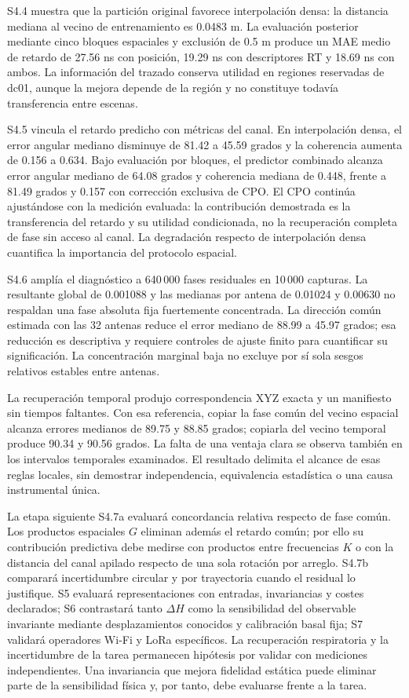 S4.4 muestra que la partición original favorece interpolación densa: la distancia mediana
al vecino de entrenamiento es 0.0483 m. La evaluación posterior mediante cinco bloques
espaciales y exclusión de 0.5 m produce un MAE medio de retardo de 27.56 ns con posición,
19.29 ns con descriptores RT y 18.69 ns con ambos. La información del trazado conserva
utilidad en regiones reservadas de dc01, aunque la mejora depende de la región y no
constituye todavía transferencia entre escenas.

S4.5 vincula el retardo predicho con métricas del canal. En interpolación densa,
el error angular mediano disminuye de 81.42 a 45.59 grados y la coherencia
aumenta de 0.156 a 0.634. Bajo evaluación por bloques,
el predictor combinado alcanza error angular mediano de 64.08 grados y coherencia
mediana de 0.448, frente a 81.49 grados y 0.157 con corrección exclusiva de CPO.
El CPO continúa ajustándose con la medición evaluada: la contribución demostrada es
la transferencia del retardo y su utilidad condicionada, no la recuperación completa
de fase sin acceso al canal. La degradación respecto de interpolación densa cuantifica
la importancia del protocolo espacial.

S4.6 amplía el diagnóstico a 640\,000 fases residuales en 10\,000 capturas.
La resultante global de 0.001088 y las medianas por antena de 0.01024 y 0.00630
no respaldan una fase absoluta fija fuertemente concentrada. La dirección común
estimada con las 32 antenas reduce el error mediano de 88.99 a 45.97 grados;
esa reducción es descriptiva y requiere controles de ajuste finito para
cuantificar su significación. La concentración marginal baja no excluye por
sí sola sesgos relativos estables entre antenas.

La recuperación temporal produjo correspondencia XYZ exacta y un manifiesto
sin tiempos faltantes. Con esa referencia, copiar la fase común del vecino
espacial alcanza errores medianos de 89.75 y 88.85 grados; copiarla del vecino
temporal produce 90.34 y 90.56 grados. La falta de una ventaja clara se observa
también en los intervalos temporales examinados. El resultado delimita el
alcance de esas reglas locales, sin demostrar independencia, equivalencia
estadística o una causa instrumental única.

La etapa siguiente S4.7a evaluará concordancia relativa respecto de fase común.
Los productos espaciales $G$ eliminan además el retardo común; por ello su
contribución predictiva debe medirse con productos entre frecuencias $K$ o con
la distancia del canal apilado respecto de una sola rotación por arreglo.
S4.7b comparará incertidumbre circular y por trayectoria cuando el residual lo justifique.
S5 evaluará representaciones con entradas, invariancias y costes declarados;
S6 contrastará tanto $\Delta H$ como la sensibilidad del observable invariante
mediante desplazamientos conocidos y calibración basal fija; S7 validará
operadores Wi-Fi y LoRa específicos. La recuperación respiratoria y la
incertidumbre de la tarea permanecen hipótesis por validar con mediciones
independientes. Una invariancia que mejora fidelidad estática puede eliminar
parte de la sensibilidad física y, por tanto, debe evaluarse frente a la tarea.


